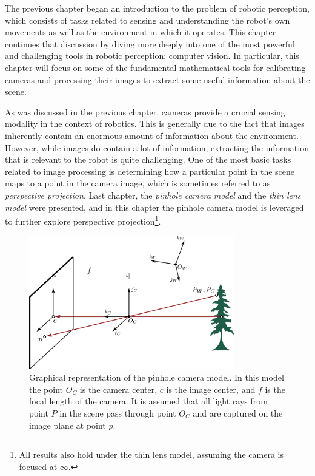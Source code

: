 The previous chapter began an introduction to the problem of robotic perception, which consists of tasks related to sensing and understanding the robot's own movements as well as the environment in which it operates\cite{SiegwartNourbakhshEtAl2011}. This chapter continues that discussion by diving more deeply into one of the most powerful and challenging tools in robotic perception: computer vision. In particular, this chapter will focus on some of the fundamental mathematical tools for calibrating cameras and processing their images to extract some useful information about the scene\cite{ForsythPonce2011}\cite{HartleyZisserman2002}\nocite{Tsai1987}.
\nocite{Bradski2000}

As was discussed in the previous chapter, cameras provide a crucial sensing modality in the context of robotics. This is generally due to the fact that images inherently contain an enormous amount of information about the environment. However, while images do contain a lot of information, extracting the information that is relevant to the robot is quite challenging. One of the most basic tasks related to image processing is determining how a particular point in the scene maps to a point in the camera image, which is sometimes referred to as \textit{perspective projection}. Last chapter, the \textit{pinhole camera model} and the \textit{thin lens model} were presented, and in this chapter the pinhole camera model is leveraged to further explore perspective projection\footnote{All results also hold under the thin lens model, assuming the camera is focused at $\infty$.}.

\begin{figure}[ht]
\includegraphics[width=0.8\textwidth]{tex/figs/ch08_figs/pinholecamera2.png}
\centering
\caption{Graphical representation of the pinhole camera model. In this model the point $O_C$ is the camera center, $c$ is the image center, and $f$ is the focal length of the camera. It is assumed that all light rays from point $P$ in the scene pass through point $O_C$ and are captured on the image plane at point $p$.}
\label{fig:pinhole_cam}
\end{figure}

